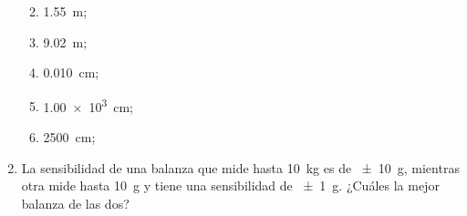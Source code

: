 \documentclass[
]{article}
\begin{document}
\begin{enumerate}
  \begin{enumerate}
  \def\labelenumii{\arabic{enumii}.}
  \item
    1.55~m;
  \item
    9.02~m;
  \item
    0.010~cm;
  \item
    1.00~×~10\textsuperscript{3}~cm;
  \item
    2500~cm;
  \end{enumerate}
\item
  La sensibilidad de una balanza que mide hasta 10~kg es de ~±~10~g,
  mientras otra mide hasta 10~g y tiene una sensibilidad de ~±~1~g.
  ¿Cuáles la mejor balanza de las dos?
\end{enumerate}
\end{document}
